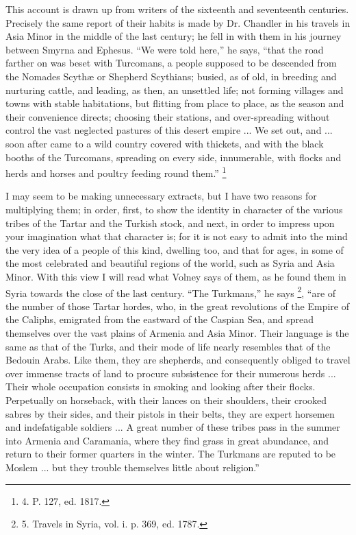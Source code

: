 This account is drawn up from
writers of the sixteenth and seventeenth centuries. Precisely the same
report of their habits is made by Dr. Chandler in his travels in Asia
Minor in the middle of the last century; he fell in with them in his
journey between Smyrna and Ephesus. ``We were told here,'' he says, ``that
the road farther on was beset with Turcomans, a people supposed to be
descended from the Nomades Scythæ or Shepherd Scythians; busied, as
of old, in breeding and nurturing cattle, and leading, as then, an
unsettled life; not forming villages and towns with stable
habitations, but flitting from place to place, as the season and their
convenience directs; choosing their stations, and over-spreading
without control the vast neglected pastures of this desert empire ...
We set out, and ... soon after came to a wild country covered with
thickets, and with the black booths of the Turcomans, spreading on
every side, innumerable, with flocks and herds and horses and poultry
feeding round them.'' \footnote{4.
P. 127, ed. 1817.}

I may seem to be making
unnecessary extracts, but I have two reasons for multiplying them; in
order, first, to show the identity in character of the various tribes
of the Tartar and the Turkish stock, and next, in order to impress
upon your imagination what that character is; for it is not easy to
admit into the mind the very idea of a people of this kind, dwelling
too, and that for ages, in some of the most celebrated and beautiful
regions of the world, such as Syria and Asia Minor. With this view I
will read what Volney says of them, as he found them in Syria
towards the close of the last century. ``The Turkmans,'' he says \footnote{5.
Travels in Syria, vol. i. p. 369, ed. 1787.}, ``are of the number of those Tartar hordes, who, in the great
revolutions of the Empire of the Caliphs, emigrated from the eastward
of the Caspian Sea, and spread themselves over the vast plains of
Armenia and Asia Minor. Their language is the same as that of the
Turks, and their mode of life nearly resembles that of the Bedouin
Arabs. Like them, they are shepherds, and consequently obliged to
travel over immense tracts of land to procure subsistence for their
numerous herds ... Their whole occupation consists in smoking and
looking after their flocks. Perpetually on horseback, with their
lances on their shoulders, their crooked sabres by their sides, and
their pistols in their belts, they are expert horsemen and
indefatigable soldiers ... A great number of these tribes pass in the
summer into Armenia and Caramania, where they find grass in great
abundance, and return to their former quarters in the winter. The
Turkmans are reputed to be Moslem ... but they trouble themselves
little about religion.''

